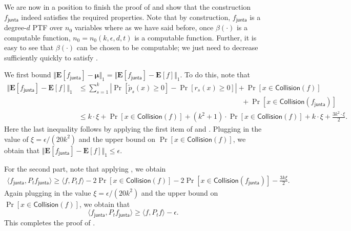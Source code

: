 \documentclass{toc}
\newcommand{\fh}{{f_{\mathsf{junta}}}}
\begin{document}
We are now in a position to finish the proof of  and
show that the construction $\fh$ indeed satisfies the required properties. Note
that by construction, $\fh$ is a degree-$d$ PTF over $n_0$ variables where as
we have said before, once $\beta (\cdot)$ is a computable function, $n_0 = n_0(k,
\epsilon, d, t)$ is a computable function. Further, it is easy to see that
$\beta(\cdot)$ can be chosen to be computable; we just need to decrease sufficiently quickly
to satisfy
. 

We first bound $\Vert \mathbf{E}[\fh] - \boldsymbol{\mu}\Vert_1 = \Vert \mathbf{E}[\fh] - \mathbf{E}[f] \Vert_1$. To do this, note that 
\begin{align*}
  \Vert \mathbf{E}[\fh] - \mathbf{E}[f] \Vert_1 &\le \sum_{s=1}^k |\Pr[\tilde{p}_s(x) \ge 0] - \Pr[{r}_s(x) \ge 0] | + \Pr[x \in \mathsf{Collision}(f)]\\
  &\phantom{\le \sum_{s=1}^k |\Pr[\tilde{p}_s(x) \ge 0] - \Pr[{r}_s(x) \ge 0] }\:\:\:\: + \Pr[x \in \mathsf{Collision}(\fh)] \\ &\le k \cdot \xi + \Pr[ x \in \mathsf{Collision}(f)] + (k^2 +1) \cdot \Pr[ x \in \mathsf{Collision}(f)] + k \cdot \xi + \frac{3 k^2 \cdot \xi}{2}. 
\end{align*}
Here the last inequality follows by applying the first item of  and . Plugging in the value of $\xi = {\epsilon}/{(20k^2)}$ and the upper bound on $\Pr[x \in \mathsf{Collision}(f)]$, we obtain that $\Vert \mathbf{E}[\fh] - \mathbf{E}[f] \Vert_1 \le \epsilon$. 

For the second part, note that applying , we obtain
\begin{eqnarray*}
\langle \fh, P_t \fh \rangle \ge \langle f, P_t f \rangle - 2\Pr[x \in \mathsf{Collision}(f)] -2 \Pr[x \in \mathsf{Collision}(\fh)] - \frac{3k\xi}{2}. 
\end{eqnarray*}
Again plugging in the value $\xi = {\epsilon}/{(20k^2)}$ and the upper bound on $\Pr[x \in \mathsf{Collision}(f)]$, we obtain that 
$$
\langle \fh, P_t \fh \rangle \ge \langle f, P_t f \rangle - \epsilon.
$$
This completes the proof of .

\nocite{DMN17-conf}   %
\nocite{Kalai:02}     %


%
%
%
%

\end{document}
